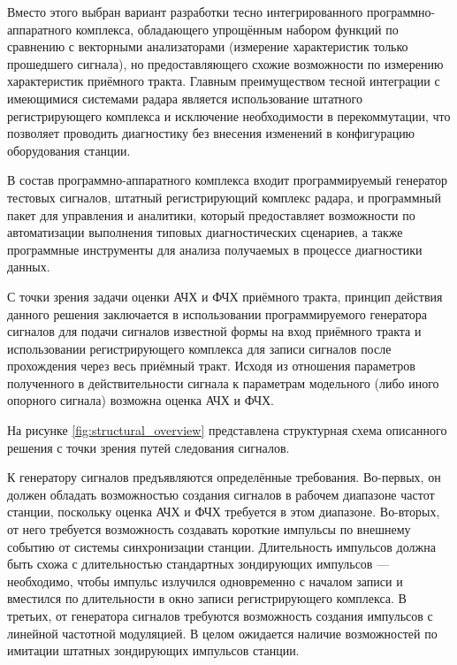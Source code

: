 \documentclass{report}
\begin{document}
Вместо этого выбран вариант разработки тесно интегрированного программно-аппаратного комплекса, обладающего упрощённым набором функций по сравнению с векторными анализаторами (измерение характеристик только прошедшего сигнала), но предоставляющего схожие возможности по измерению характеристик приёмного тракта. Главным преимуществом тесной интеграции с имеющимися системами радара является использование штатного регистрирующего комплекса и исключение необходимости в перекоммутации, что позволяет проводить диагностику без внесения изменений в конфигурацию оборудования станции.

В состав программно-аппаратного комплекса входит программируемый генератор тестовых сигналов, штатный регистрирующий комплекс радара, и программный пакет для управления и аналитики, который предоставляет возможности по автоматизации выполнения типовых диагностических сценариев, а также программные инструменты для анализа получаемых в процессе диагностики данных.

С точки зрения задачи оценки АЧХ и ФЧХ приёмного тракта, принцип действия данного решения заключается в использовании программируемого генератора сигналов для подачи сигналов известной формы на вход приёмного тракта и использовании регистрирующего комплекса для записи сигналов после прохождения через весь приёмный тракт. Исходя из отношения параметров полученного в действительности сигнала к параметрам модельного (либо иного опорного сигнала) возможна оценка АЧХ и ФЧХ.

\pagebreak

На рисунке \ref{fig:structural_overview} представлена структурная схема описанного решения с точки зрения путей следования сигналов.


К генератору сигналов предъявляются определённые требования. Во-первых, он должен обладать возможностью создания сигналов в рабочем диапазоне частот станции, поскольку оценка АЧХ и ФЧХ требуется в этом диапазоне. Во-вторых, от него требуется возможность создавать короткие импульсы по внешнему событию от системы синхронизации станции. Длительность импульсов должна быть схожа с длительностью стандартных зондирующих импульсов --- необходимо, чтобы импульс излучился одновременно с началом записи и вместился по длительности в окно записи регистрирующего комплекса. В третьих, от генератора сигналов требуются возможность создания импульсов с линейной частотной модуляцией. В целом ожидается наличие возможностей по имитации штатных зондирующих импульсов станции.
\end{document}
